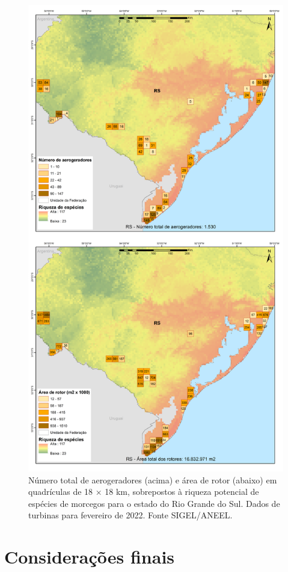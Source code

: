\documentclass[
  oneside]{scrbook}
\begin{document}
\begin{figure}[H]

{\centering \includegraphics[width=0.75\linewidth]{imagens/cap09/Figura_9.17} 

}

\caption{Número total de aerogeradores (acima) e área de rotor (abaixo) em quadrículas de 18 × 18 km, sobrepostos à riqueza potencial de espécies de morcegos para o estado do Rio Grande do Sul. Dados de turbinas para fevereiro de 2022. Fonte SIGEL/ANEEL.}\label{fig:82}
\end{figure}

\hypertarget{considerauxe7uxf5es-finais}{%
\section{Considerações finais}\label{considerauxe7uxf5es-finais}}
\end{document}

